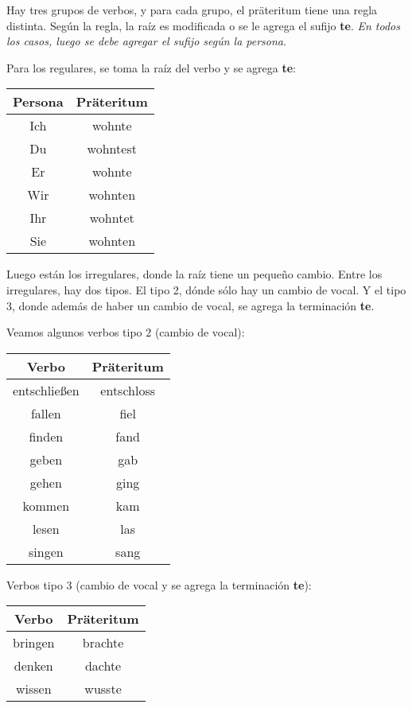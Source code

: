 Hay tres grupos de verbos, y para cada grupo, el präteritum tiene una regla distinta. Según la regla, la raíz es modificada o se le agrega el sufijo \textbf{te}. \textit{En todos los casos, luego se debe agregar el sufijo según la persona}.

Para los regulares, se toma la raíz del verbo y se agrega \textbf{te}:

\begin{tabular}{|c|c|}
\hline
\textbf{Persona} & \textbf{Präteritum}\\
\hline
Ich & wohnte   \\
Du  & wohntest \\
Er  & wohnte   \\
Wir & wohnten  \\
Ihr & wohntet  \\
Sie & wohnten  \\
\hline
\end{tabular}

Luego están los irregulares, donde la raíz tiene un pequeño cambio.
Entre los irregulares, hay dos tipos. El tipo 2, dónde sólo hay un cambio de vocal. Y el tipo 3, donde además de haber un cambio de vocal, se agrega la terminación \textbf{te}.

Veamos algunos verbos tipo 2 (cambio de vocal):

\begin{tabular}{|c|c|}
\hline
\textbf{Verbo} & \textbf{Präteritum}\\
\hline
entschließen & entschloss \\
fallen & fiel \\
finden & fand \\
geben & gab \\
gehen & ging \\
kommen & kam \\
lesen & las \\
singen & sang \\
\hline
\end{tabular}

Verbos tipo 3 (cambio de vocal y se agrega la terminación \textbf{te}):

\begin{tabular}{|c|c|}
\hline
\textbf{Verbo} & \textbf{Präteritum}\\
\hline
bringen & brachte \\
denken & dachte \\
wissen & wusste \\
\hline
\end{tabular}

